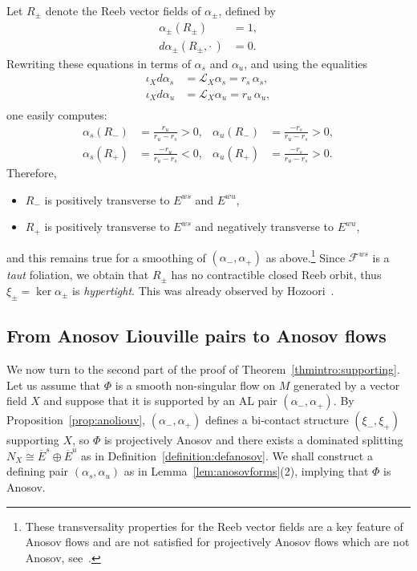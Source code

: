 \documentclass[letterpaper, 11pt]{article}
\numberwithin{equation}{section}
\begin{document}
Let $R_\pm$ denote the Reeb vector fields of $\alpha_\pm$, defined by
\begin{align*}
\alpha_\pm(R_\pm) &= 1, \\
d\alpha_\pm(R_\pm, \cdot \, ) &= 0.
\end{align*}
Rewriting these equations in terms of $\alpha_s$ and $\alpha_u$, and using the equalities
\begin{align*}
\iota_X d\alpha_s &= \mathcal{L}_X \alpha_s = r_s \, \alpha_s, \\
\iota_X d\alpha_u &= \mathcal{L}_X \alpha_u = r_u \, \alpha_u, \\
\end{align*}
one easily computes:
\begin{align*}
\alpha_s(R_-) &= \frac{r_u}{r_u - r_s}>0, & \alpha_u(R_-) &= \frac{-r_s}{r_u - r_s}>0, \\
\alpha_s(R_+) &= \frac{-r_u}{r_u - r_s}<0, & \alpha_u(R_+) &= \frac{-r_s}{r_u - r_s}>0.
\end{align*}
Therefore,
\begin{itemize}
    \item $R_-$ is positively transverse to $E^{ws}$ and $E^{wu}$,
    \item $R_+$ is positively transverse to $E^{ws}$ and negatively transverse to $E^{wu}$,
\end{itemize}
and this remains true for a smoothing of $(\alpha_-, \alpha_+)$ as above.\footnote{These transversality properties for the Reeb vector fields are a key feature of Anosov flows and are not satisfied for projectively Anosov flows which are not Anosov, see~\cite[Theorem 6.3]{H22a}.} Since $\mathcal{F}^{ws}$ is a \emph{taut} foliation, we obtain that $R_\pm$ has no contractible closed Reeb orbit, thus $\xi_\pm = \ker \alpha_\pm$ is \emph{hypertight}. This was already observed by Hozoori~\cite[Theorem 1.11]{H22a}.

		\subsection{From Anosov Liouville pairs to Anosov flows} \label{sec:AL}
  
We now turn to the second part of the proof of Theorem~\ref{thmintro:supporting}. Let us assume that $\Phi$ is a smooth non-singular flow on $M$ generated by a vector field $X$ and suppose that it is supported by an AL pair $(\alpha_-, \alpha_+)$. By Proposition~\ref{prop:anoliouv}, $(\alpha_-, \alpha_+)$ defines a bi-contact structure $(\xi_-, \xi_+)$ supporting $X$, so $\Phi$ is projectively Anosov and there exists a dominated splitting $N_X \cong \overline{E}^s \oplus \overline{E}^u$ as in Definition~\ref{definition:defanosov}. We shall construct a defining pair $(\alpha_s, \alpha_u)$ as in Lemma~\ref{lem:anosovforms}(2), implying that $\Phi$ is Anosov.
\end{document}
